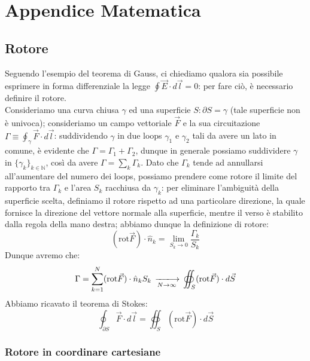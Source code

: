 \section{Appendice Matematica}

\subsection{Rotore}

Seguendo l'esempio del teorema di Gauss, ci chiediamo qualora sia possibile esprimere in forma differenziale la legge $ \oint \vec{E} \cdot d\vec{l} = 0 $: per fare ciò, è necessario definire il rotore. \\
%
Consideriamo una curva chiusa $ \gamma $ ed una superficie $ S : \partial S = \gamma $ (tale superficie non è univoca); consideriamo un campo vettoriale $ \vec{F} $ e la sua circuitazione $ \Gamma \equiv \oint_{\gamma} \vec{F} \cdot d\vec{l} $: suddividendo $ \gamma $ in due loops $ \gamma_1 $ e $ \gamma_2 $ tali da avere un lato in comune, è evidente che $ \Gamma = \Gamma_1 + \Gamma_2 $, dunque in generale possiamo suddividere $ \gamma $ in $ \{\gamma_k\}_{k\in\mathbb{N}} $, così da avere $ \Gamma = \sum_{k} \Gamma_k $. Dato che $ \Gamma_k $ tende ad annullarsi all'aumentare del numero dei loops, possiamo prendere come rotore il limite del rapporto tra $ \Gamma_k $ e l'area $ S_k $ racchiusa da $ \gamma_k $: per eliminare l'ambiguità della superficie scelta, definiamo il rotore rispetto ad una particolare direzione, la quale fornisce la direzione del vettore normale alla superficie, mentre il verso è stabilito dalla regola della mano destra; abbiamo dunque la definizione di rotore:
\begin{equation}
	( \text{rot} \vec{F} ) \cdot \hat{n}_k = \lim_{S_k \rightarrow 0} \frac{\Gamma_k}{S_k}
	\label{eq:}
\end{equation}
Dunque avremo che:
\begin{equation}
	\Gamma = \displaystyle\sum_{k = 1}^{N} ( \text{rot} \vec{F} ) \cdot \hat{n}_k S_k \,\xlongrightarrow[N \rightarrow \infty]{}\, \oiint_S ( \text{rot} \vec{F} ) \cdot d\vec{S}
	\label{eq:}
\end{equation}
Abbiamo ricavato il teorema di Stokes:
\begin{equation}
	\oint_{\partial S} \vec{F} \cdot d\vec{l} = \oiint_S ( \text{rot} \vec{F} ) \cdot d\vec{S}
	\label{eq:}
\end{equation}

\subsubsection{Rotore in coordinare cartesiane}

